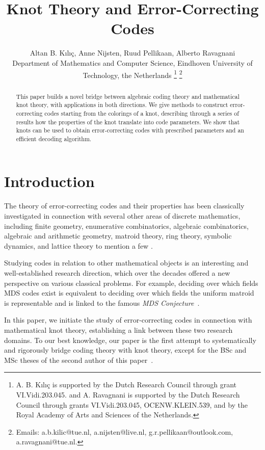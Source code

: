 \documentclass[11pt,a4paper]{article}
\title{\textbf{Knot Theory and Error-Correcting Codes}}
\author{Altan B. K\i l\i\c{c}, Anne Nijsten, Ruud Pellikaan, Alberto Ravagnani \\ 
Department of Mathematics and Computer Science, Eindhoven University of Technology, the Netherlands
\thanks{A. B. K\i l\i\c{c} is supported by the Dutch Research Council through grant VI.Vidi.203.045. and A. Ravagnani is supported by the Dutch Research Council through grants VI.Vidi.203.045, 
OCENW.KLEIN.539, 
and by the Royal Academy of Arts and Sciences of the Netherlands.}
\thanks{Emails: a.b.kilic@tue.nl, a.nijsten@live.nl, g.r.pellikaan@outlook.com, a.ravagnani@tue.nl.}}
\date{}
\theoremstyle{definition}
\begin{document}
\maketitle


\vspace{ 1 cm}
\begin{abstract}

This paper builds a novel bridge
between algebraic coding theory and mathematical knot theory, with applications in both directions. We give methods to construct error-correcting codes starting from the colorings of a knot, describing through a series of results how the properties of the knot translate into code parameters. We show that 
knots can be used 
to obtain error-correcting codes
with prescribed parameters 
and an efficient decoding algorithm. 
\end{abstract}



\medskip

\section*{Introduction}

The theory of error-correcting codes and their properties has been classically investigated in connection with several other areas of discrete mathematics, including finite geometry, enumerative combinatorics, algebraic combinatorics, algebraic and arithmetic geometry, matroid theory, ring theory, symbolic dynamics, and lattice theory to mention a few \cite{lind2021introduction, blake2014introduction,oxley2006matroid, stichtenoth2009algebraic, ball2015finite,ebeling2013lattices}. 

Studying codes in relation to other mathematical objects is 
an interesting and well-established 
research direction, which over the decades offered a new perspective on various classical problems. For example, deciding over which fields MDS codes exist is equivalent to deciding over which fields the uniform matroid is representable and is linked to the famous \textit{MDS Conjecture}~\cite{segre1955curve}. 

In this paper, we initiate the study of error-correcting codes in connection with mathematical knot theory, establishing a link between these two research domains. To our best knowledge, our paper is the first attempt to systematically and rigorously bridge coding theory with knot theory, except for the BSc and MSc theses of the second author of this paper~\cite{nijsten2019knots,nijsten2022knots}.
\end{document}
